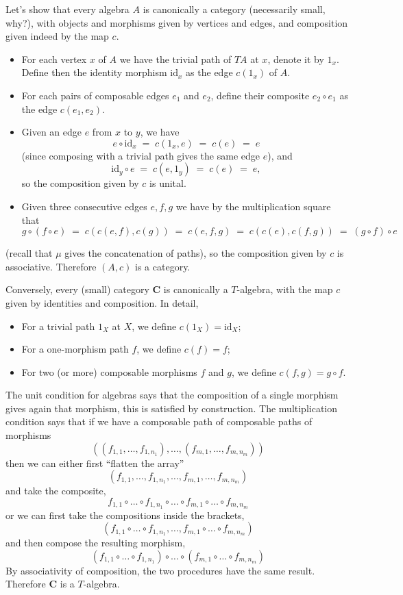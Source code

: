 \documentclass[a4paper,11pt,oneside]{scrbook}
\numberwithin{equation}{section}
\theoremstyle{plain}
\theoremstyle{definition}
\newcommand{\cat}[1]{{\mathbf{#1}}} %
\DeclareMathOperator{\1}{\mathbbm{1}}
\DeclareMathOperator{\2}{\mathbbm{2}}
\newcommand{\id}{\mathrm{id}} %
\begin{document}
 Let's show that every algebra $A$ is canonically a category (necessarily small, why?), with objects and morphisms given by vertices and edges, and composition given indeed by the map $c$. 
 \begin{itemize}
  \item For each vertex $x$ of $A$ we have the trivial path of $TA$ at $x$, denote it by $1_x$. Define then the identity morphism $\id_x$ as the edge $c(1_x)$ of $A$. 
  \item For each pairs of composable edges $e_1$ and $e_2$, define their composite $e_2\circ e_1$ as the edge $c(e_1,e_2)$. 
  \item Given an edge $e$ from $x$ to $y$, we have
  $$
  e \circ \id_x \;=\; c(1_x,e) \;=\; c(e) \;=\;e
  $$
  (since composing with a trivial path gives the same edge $e$), and 
  $$
  \id_y\circ e \;=\; c(e,1_y) \;=\; c(e) \;=\; e ,
  $$
  so the composition given by $c$ is unital.
  \item Given three consecutive edges $e,f,g$ we have by the multiplication square that
  $$
  g\circ (f\circ e) \;=\; c(c(e,f),c(g)) \;=\; c(e,f,g) \;=\; c(c(e),c(f,g)) \;=\; (g\circ f)\circ e 
  $$
 \end{itemize}
 (recall that $\mu$ gives the concatenation of paths),
 so the composition given by $c$ is associative.
 Therefore $(A,c)$ is a category.

 Conversely, every (small) category $\cat{C}$ is canonically a $T$-algebra, with the map $c$ given by identities and composition. In detail,
 \begin{itemize}
  \item For a trivial path $1_X$ at $X$, we define $c(1_X)=\id_X$;
  \item For a one-morphism path $f$, we define $c(f)=f$;
  \item For two (or more) composable morphisms $f$ and $g$, we define $c(f,g)=g\circ f$. 
 \end{itemize}
 The unit condition for algebras says that the composition of a single morphism gives again that morphism, this is satisfied by construction. The multiplication condition says that if we have a composable path of composable paths of morphisms 
 $$
 ((f_{1,1},\dots,f_{1,n_1}),\dots,(f_{m,1},\dots,f_{m,n_m}))
 $$
 then we can either first ``flatten the array'' 
 $$
 (f_{1,1},\dots,f_{1,n_1},\dots,f_{m,1},\dots,f_{m,n_m})
 $$
 and take the composite,
 $$
 f_{1,1}\circ\dots\circ f_{1,n_1}\circ\dots\circ f_{m,1}\circ\dots\circ f_{m,n_m}
 $$
 or we can first take the compositions inside the brackets,
 $$
 (f_{1,1}\circ\dots\circ f_{1,n_1},\dots,f_{m,1}\circ\dots\circ f_{m,n_m})
 $$
 and then compose the resulting morphism,
 $$
 (f_{1,1}\circ\dots\circ f_{1,n_1})\circ\dots\circ (f_{m,1}\circ\dots\circ f_{m,n_m})
 $$
 By associativity of composition, the two procedures have the same result. Therefore $\cat{C}$ is a $T$-algebra.
 
\end{document}
